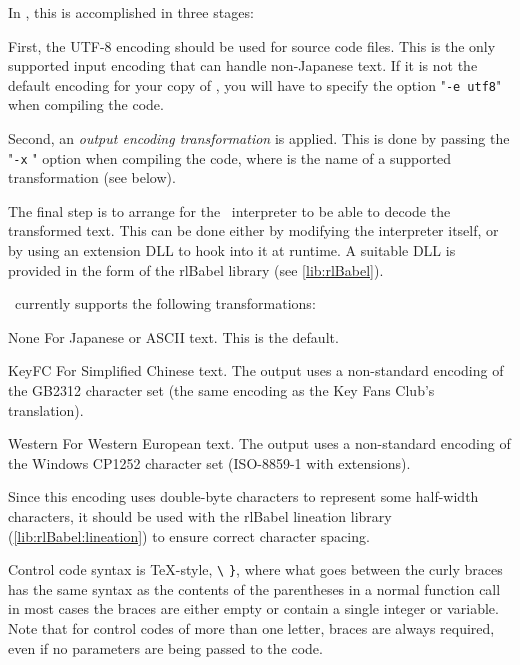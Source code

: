     In \package, this is accomplished in three stages:
    
    First, the UTF-8 encoding should be used for source code files.  This is the 
    only supported input encoding that can handle non-Japanese text.  If it is
    not the default encoding for your copy of \package, you will have to specify
    the option "\texttt{-e utf8}" when compiling the code.
    
    Second, an \emph{output encoding transformation} is applied.  This is done 
    by passing the "\texttt{-x} " option when compiling the code, 
    where  is the name of a supported transformation (see below).
    
    The final step is to arrange for the \reallive\ interpreter to be able to 
    decode the transformed text.  This can be done either by modifying the 
    interpreter itself, or by using an extension DLL to hook into it at 
    runtime.  A suitable DLL is provided in the form of the rlBabel library
    (see \ref{lib:rlBabel}).
    
    \package\ currently supports the following transformations:
    
    \begin{nicelist}
    \item[None]
      For Japanese or ASCII text. This is the default.
    \item[KeyFC]
      For Simplified Chinese text. The output uses a non-standard encoding of 
      the GB2312 character set (the same encoding as the Key Fans Club's 
       translation).
    \item[Western]
      For Western European text. The output uses a non-standard encoding of
      the Windows CP1252 character set (ISO-8859-1 with extensions).
      
      Since this encoding uses double-byte characters to represent some 
      half-width characters, it should be used with the rlBabel lineation 
      library (\ref{lib:rlBabel:lineation}) to ensure correct character spacing.      
    \end{nicelist}


    Control code syntax is \TeX-style, \lstinline|\|%
    \rawlbrace\lstinline|}|, where what goes between the curly braces has the
    same syntax as the contents of the parentheses in a normal function
    call\,\textemdash\,in most cases the braces are either empty or contain a
    single integer or variable.  Note that for control codes of more than one
    letter, braces are always required, even if no parameters are being passed
    to the code.

